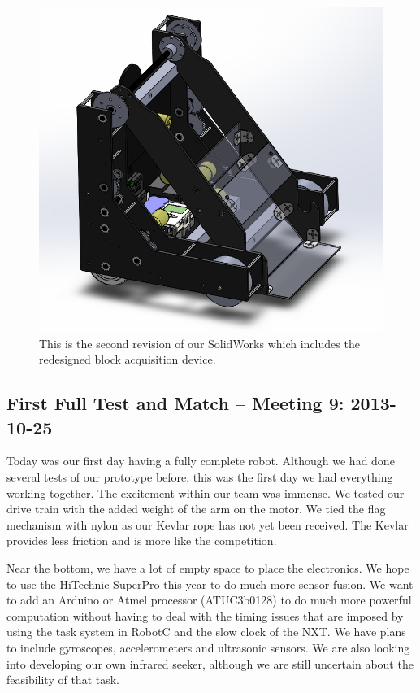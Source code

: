 \begin{figure}[h]
\begin{center}
\includegraphics[scale=0.75]{images/RobotV2.png}
\end{center}
\caption{This is the second revision of our SolidWorks which includes the redesigned block acquisition device.}
\end{figure}

\newpage \subsection{First Full Test and Match -- Meeting 9: 2013-10-25}
Today was our first day having a fully complete robot. Although we had done several tests of our prototype before, this was the first day we had everything working together. The excitement within our team was immense. We tested our drive train with the added weight of the arm on the motor. We tied the flag mechanism with nylon as our Kevlar rope has not yet been received. The Kevlar provides less friction and is more like the competition.

Near the bottom, we have a lot of empty space to place the electronics. We hope to use the HiTechnic SuperPro this year to do much more sensor fusion. We want to add an Arduino or Atmel processor (ATUC3b0128) to do much more powerful computation without having to deal with the timing issues that are imposed by using the task system in RobotC and the slow clock of the NXT. We have plans to include gyroscopes, accelerometers and ultrasonic sensors. We are also looking into developing our own infrared seeker, although we are still uncertain about the feasibility of that task. 

